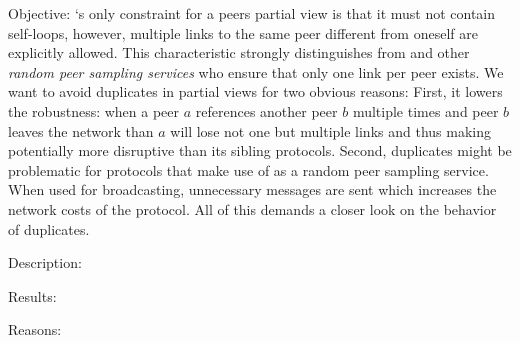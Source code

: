 \begin{asparadesc} 
\item[Objective:]
    \SCAMPLON{}`s only constraint for a peers partial view is that it must not contain
    self-loops, however, multiple links to the same peer different from oneself
    are explicitly allowed.
    This characteristic strongly distinguishes \SCAMPLON{} from \CYCLON{} and other 
    \emph{random peer sampling services} who ensure that only one link per peer exists.
    We want to avoid duplicates in partial views for two obvious reasons:
    First, it lowers the robustness: when a peer $a$ references another peer $b$ 
    multiple times and peer $b$ leaves the network than $a$ will lose not one but 
    multiple links and thus making \SCAMPLON{} potentially more disruptive than 
    its sibling protocols.
    Second, duplicates might be problematic for protocols that make use of \SCAMPLON{} as
    a random peer sampling service. When used for broadcasting, unnecessary messages
    are sent which increases the network costs of the protocol.
    All of this demands a closer look on the behavior of duplicates.
\item[Description:]
\item[Results:]
\item[Reasons:]

\end{asparadesc}


